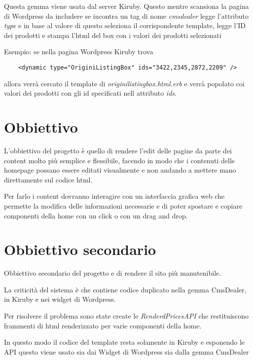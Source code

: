 Questa gemma viene usata dal server Kiruby. Questo mentre scansiona la pagina di Wordpress da includere
se incontra un tag di nome \emph{cmsdealer} legge l'attributo \emph{type} e in base al valore di questo
seleziona il corrispondente template, legge l'ID dei prodotti e stampa l'html del box con
i valori dei prodotti selezionati

Esempio: se nella pagina Wordpress Kiruby trova
\begin{verbatim}
	<dynamic type="OriginiListingBox" ids="3422,2345,2872,2209" />
\end{verbatim}
allora verrà cercato il template di \emph{originilistingbox.html.erb} e verrà popolato
coi valori dei prodotti con gli id specificati nell attributo \emph{ids}.

\newpage
\section{Obbiettivo}
L'obbiettivo del progetto è quello di rendere l'edit delle pagine
da parte dei content molto più semplice e flessibile,
facendo in modo che i contenuti delle homepage possano essere editati visualmente e non
andando a mettere mano direttamente sul codice html.

Per farlo i content dovranno interagire con un interfaccia grafica web che permette
la modifica delle informazioni necessarie e di poter spostare e copiare
componenti della home con un click o con un drag and drop.

\section{Obbiettivo secondario}
Obbiettivo secondario del progetto e di rendere il sito più manutenibile.

La criticità del sistema è che contiene codice duplicato nella gemma CmsDealer, in Kiruby
e nei widget di Wordpress. 

Per risolvere il problema sono state create le  \emph{RenderdPricesAPI} 
che restituiscono frammenti di html renderizzato per varie componenti della home.

In questo modo il codice del template resta solamente in Kiruby e esponendo le 
API questo viene usato sia dai Widget di Wordpress sia dalla gemma CmsDealer
